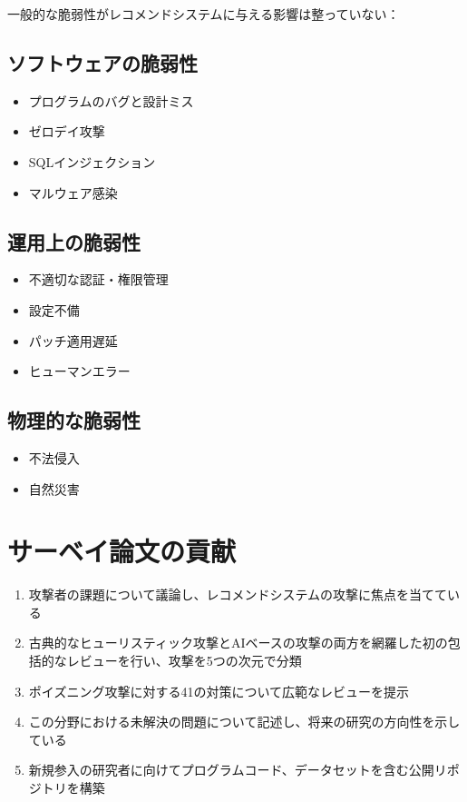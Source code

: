 \documentclass[11pt,a4paper]{article}
\begin{document}
一般的な脆弱性がレコメンドシステムに与える影響は整っていない：

\subsection{ソフトウェアの脆弱性}
\begin{itemize}
    \item プログラムのバグと設計ミス
    \item ゼロデイ攻撃
    \item SQLインジェクション
    \item マルウェア感染
\end{itemize}

\subsection{運用上の脆弱性}
\begin{itemize}
    \item 不適切な認証・権限管理
    \item 設定不備
    \item パッチ適用遅延
    \item ヒューマンエラー
\end{itemize}

\subsection{物理的な脆弱性}
\begin{itemize}
    \item 不法侵入
    \item 自然災害
\end{itemize}

\section{サーベイ論文の貢献}

\begin{enumerate}
    \item 攻撃者の課題について議論し、レコメンドシステムの攻撃に焦点を当てている
    \item 古典的なヒューリスティック攻撃とAIベースの攻撃の両方を網羅した初の包括的なレビューを行い、攻撃を5つの次元で分類
    \item ポイズニング攻撃に対する41の対策について広範なレビューを提示
    \item この分野における未解決の問題について記述し、将来の研究の方向性を示している
    \item 新規参入の研究者に向けてプログラムコード、データセットを含む公開リポジトリを構築
\end{enumerate}
\end{document}
